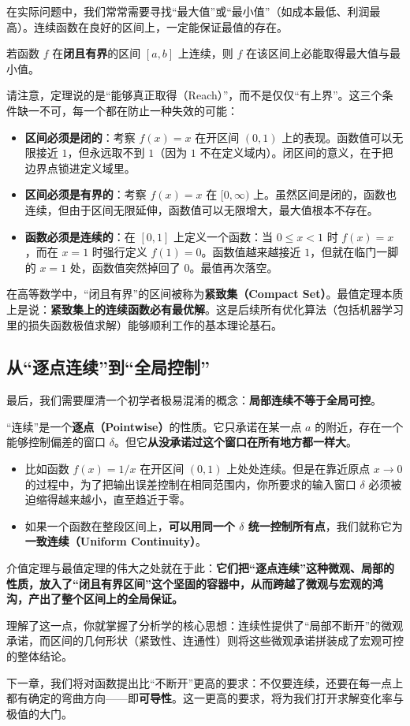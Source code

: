 在实际问题中，我们常常需要寻找``最大值''或``最小值''（如成本最低、利润最高）。连续函数在良好的区间上，一定能保证最值的存在。

\begin{theorem}[最值定理]
若函数 \(f\) 在\textbf{闭且有界}的区间 \([a,b]\) 上连续，则 \(f\) 在该区间上必能取得最大值与最小值。
\end{theorem}

请注意，定理说的是``能够真正取得（Reach）''，而不是仅仅``有上界''。这三个条件缺一不可，每一个都在防止一种失效的可能：

\begin{itemize}
\tightlist
  \item \textbf{区间必须是闭的}：考察 \(f(x)=x\) 在开区间 \((0,1)\) 上的表现。函数值可以无限接近 \(1\)，但永远取不到 \(1\)（因为 \(1\) 不在定义域内）。闭区间的意义，在于把边界点锁进定义域里。
  \item \textbf{区间必须是有界的}：考察 \(f(x)=x\) 在 \([0,\infty)\) 上。虽然区间是闭的，函数也连续，但由于区间无限延伸，函数值可以无限增大，最大值根本不存在。
  \item \textbf{函数必须是连续的}：在 \([0,1]\) 上定义一个函数：当 \(0\le x<1\) 时 \(f(x)=x\)，而在 \(x=1\) 时强行定义 \(f(1)=0\)。函数值越来越接近 \(1\)，但就在临门一脚的 \(x=1\) 处，函数值突然掉回了 \(0\)。最值再次落空。
\end{itemize}

在高等数学中，``闭且有界''的区间被称为\textbf{紧致集（Compact Set）}。最值定理本质上是说：\textbf{紧致集上的连续函数必有最优解}。这是后续所有优化算法（包括机器学习里的损失函数极值求解）能够顺利工作的基本理论基石。

\subsection{从“逐点连续”到“全局控制”}

最后，我们需要厘清一个初学者极易混淆的概念：\textbf{局部连续不等于全局可控}。

``连续''是一个\textbf{逐点（Pointwise）}的性质。它只承诺在某一点 \(a\) 的附近，存在一个能够控制偏差的窗口 \(\delta\)。但它\textbf{从没承诺过这个窗口在所有地方都一样大}。

\begin{itemize}
\tightlist
  \item 比如函数 \(f(x)=1/x\) 在开区间 \((0,1)\) 上处处连续。但是在靠近原点 \(x\to0\) 的过程中，为了把输出误差控制在相同范围内，你所要求的输入窗口 \(\delta\) 必须被迫缩得越来越小，直至趋近于零。
  \item 如果一个函数在整段区间上，\textbf{可以用同一个 \(\delta\) 统一控制所有点}，我们就称它为\textbf{一致连续（Uniform Continuity）}。
\end{itemize}

介值定理与最值定理的伟大之处就在于此：\textbf{它们把``逐点连续''这种微观、局部的性质，放入了``闭且有界区间''这个坚固的容器中，从而跨越了微观与宏观的鸿沟，产出了整个区间上的全局保证。}

理解了这一点，你就掌握了分析学的核心思想：连续性提供了``局部不断开''的微观承诺，而区间的几何形状（紧致性、连通性）则将这些微观承诺拼装成了宏观可控的整体结论。

下一章，我们将对函数提出比``不断开''更高的要求：不仅要连续，还要在每一点上都有确定的弯曲方向——即\textbf{可导性}。这一更高的要求，将为我们打开求解变化率与极值的大门。